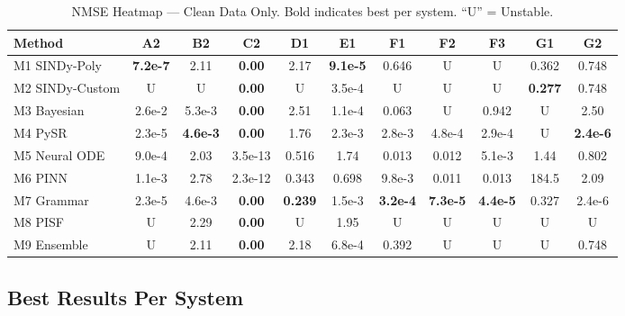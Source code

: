 \begin{table}[!ht]
\centering
\caption{NMSE Heatmap --- Clean Data Only. Bold indicates best per system. ``U'' = Unstable.}
\label{tab:heatmap}
\small
\begin{tabular}{@{}l|cccccccccc@{}}
\toprule
\textbf{Method} & \textbf{A2} & \textbf{B2} & \textbf{C2} & \textbf{D1} & \textbf{E1} & \textbf{F1} & \textbf{F2} & \textbf{F3} & \textbf{G1} & \textbf{G2} \\
\midrule
M1 SINDy-Poly & \textbf{7.2e-7} & 2.11 & \textbf{0.00} & 2.17 & \textbf{9.1e-5} & 0.646 & U & U & 0.362 & 0.748 \\
M2 SINDy-Custom & U & U & \textbf{0.00} & U & 3.5e-4 & U & U & U & \textbf{0.277} & 0.748 \\
M3 Bayesian & 2.6e-2 & 5.3e-3 & \textbf{0.00} & 2.51 & 1.1e-4 & 0.063 & U & 0.942 & U & 2.50 \\
M4 PySR & 2.3e-5 & \textbf{4.6e-3} & \textbf{0.00} & 1.76 & 2.3e-3 & 2.8e-3 & 4.8e-4 & 2.9e-4 & U & \textbf{2.4e-6} \\
M5 Neural ODE & 9.0e-4 & 2.03 & 3.5e-13 & 0.516 & 1.74 & 0.013 & 0.012 & 5.1e-3 & 1.44 & 0.802 \\
M6 PINN & 1.1e-3 & 2.78 & 2.3e-12 & 0.343 & 0.698 & 9.8e-3 & 0.011 & 0.013 & 184.5 & 2.09 \\
M7 Grammar & 2.3e-5 & 4.6e-3 & \textbf{0.00} & \textbf{0.239} & 1.5e-3 & \textbf{3.2e-4} & \textbf{7.3e-5} & \textbf{4.4e-5} & 0.327 & 2.4e-6 \\
M8 PISF & U & 2.29 & \textbf{0.00} & U & 1.95 & U & U & U & U & U \\
M9 Ensemble & U & 2.11 & \textbf{0.00} & 2.18 & 6.8e-4 & 0.392 & U & U & U & 0.748 \\
\bottomrule
\end{tabular}
\end{table}

\subsection{Best Results Per System}

